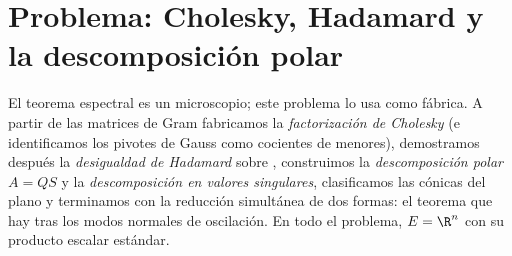 \section{Problema: Cholesky, Hadamard y la descomposición polar}

\begin{problem}\label{pb:b2:quadratic:1}
El teorema espectral es un microscopio; este problema lo usa como
fábrica. A partir de las matrices de Gram fabricamos la
\emph{factorización de Cholesky} (e
identificamos los pivotes de Gauss como cocientes de menores),
demostramos después la \emph{desigualdad de
Hadamard} sobre ,
construimos la \emph{descomposición polar} $A = QS$ y la \emph{descomposición en valores singulares},
clasificamos las cónicas del plano y terminamos con la reducción
simultánea de dos formas: el teorema que hay tras los modos normales
de oscilación. En todo el problema, $E = \R^n$ con su producto
escalar estándar.


\end{problem}
